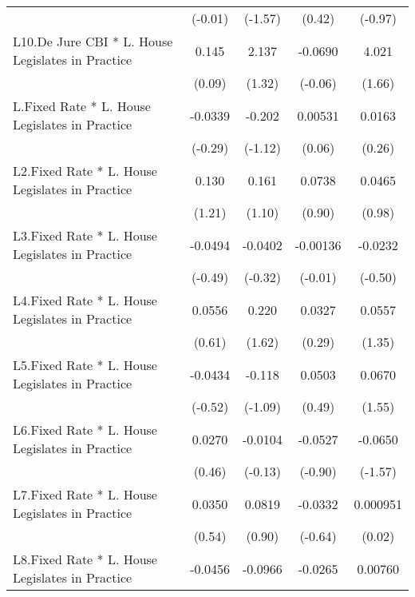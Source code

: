 {\begin{longtable}{l*{4}{c}}
                &  (-0.01)         &  (-1.57)         &   (0.42)         &  (-0.97)         \\
[1em]
L10.De Jure CBI * L. House Legislates in Practice&    0.145         &    2.137         &  -0.0690         &    4.021         \\
                &   (0.09)         &   (1.32)         &  (-0.06)         &   (1.66)         \\
[1em]
L.Fixed Rate * L. House Legislates in Practice&  -0.0339         &   -0.202         &  0.00531         &   0.0163         \\
                &  (-0.29)         &  (-1.12)         &   (0.06)         &   (0.26)         \\
[1em]
L2.Fixed Rate * L. House Legislates in Practice&    0.130         &    0.161         &   0.0738         &   0.0465         \\
                &   (1.21)         &   (1.10)         &   (0.90)         &   (0.98)         \\
[1em]
L3.Fixed Rate * L. House Legislates in Practice&  -0.0494         &  -0.0402         & -0.00136         &  -0.0232         \\
                &  (-0.49)         &  (-0.32)         &  (-0.01)         &  (-0.50)         \\
[1em]
L4.Fixed Rate * L. House Legislates in Practice&   0.0556         &    0.220         &   0.0327         &   0.0557         \\
                &   (0.61)         &   (1.62)         &   (0.29)         &   (1.35)         \\
[1em]
L5.Fixed Rate * L. House Legislates in Practice&  -0.0434         &   -0.118         &   0.0503         &   0.0670         \\
                &  (-0.52)         &  (-1.09)         &   (0.49)         &   (1.55)         \\
[1em]
L6.Fixed Rate * L. House Legislates in Practice&   0.0270         &  -0.0104         &  -0.0527         &  -0.0650         \\
                &   (0.46)         &  (-0.13)         &  (-0.90)         &  (-1.57)         \\
[1em]
L7.Fixed Rate * L. House Legislates in Practice&   0.0350         &   0.0819         &  -0.0332         & 0.000951         \\
                &   (0.54)         &   (0.90)         &  (-0.64)         &   (0.02)         \\
[1em]
L8.Fixed Rate * L. House Legislates in Practice&  -0.0456         &  -0.0966         &  -0.0265         &  0.00760         \\

\end{longtable}}
